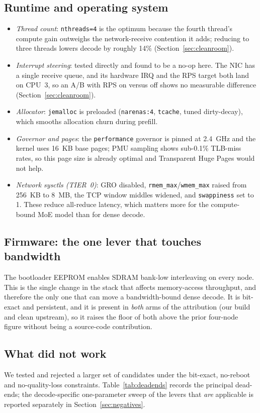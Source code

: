 \documentclass[10pt,a4paper]{article}
\begin{document}
\subsection{Runtime and operating system}
\begin{itemize}
  \item \emph{Thread count}: \texttt{nthreads=4} is the optimum because the fourth thread's compute gain outweighs the network-receive contention it adds; reducing to three threads lowers decode by roughly 14\% (Section~\ref{sec:cleanroom}).
  \item \emph{Interrupt steering}: tested directly and found to be a no-op here. The NIC has a single receive queue, and its hardware IRQ and the RPS target both land on CPU~3, so an A/B with RPS on versus off shows no measurable difference (Section~\ref{sec:cleanroom}).
  \item \emph{Allocator}: \texttt{jemalloc} is preloaded (\texttt{narenas:4}, \texttt{tcache}, tuned dirty-decay), which smooths allocation churn during prefill.
  \item \emph{Governor and pages}: the \texttt{performance} governor is pinned at 2.4~GHz and the kernel uses 16~KB base pages; PMU sampling shows sub-0.1\% TLB-miss rates, so this page size is already optimal and Transparent Huge Pages would not help.
  \item \emph{Network sysctls (TIER~0)}: GRO disabled, \texttt{rmem\_max}/\texttt{wmem\_max} raised from 256~KB to 8~MB, the TCP window middles widened, and \texttt{swappiness} set to 1. These reduce all-reduce latency, which matters more for the compute-bound MoE model than for dense decode.
\end{itemize}

\subsection{Firmware: the one lever that touches bandwidth}
The bootloader EEPROM enables SDRAM bank-low interleaving on every node. This is the single change in the stack that affects memory-access throughput, and therefore the only one that can move a bandwidth-bound dense decode. It is bit-exact and persistent, and it is present in \emph{both} arms of the attribution (our build and clean upstream), so it raises the floor of both above the prior four-node figure without being a source-code contribution.

\subsection{What did not work}
We tested and rejected a larger set of candidates under the bit-exact, no-reboot and no-quality-loss constraints. Table~\ref{tab:deadends} records the principal dead-ends; the decode-specific one-parameter sweep of the levers that \emph{are} applicable is reported separately in Section~\ref{sec:negatives}.
\end{document}
